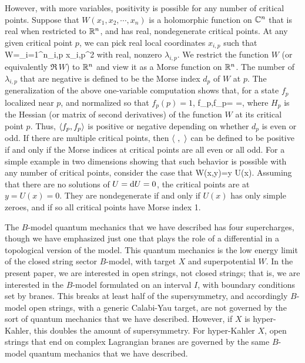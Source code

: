 \documentclass[11pt,a4paper]{article}
\begin{document}
However, with more variables, positivity is possible for any number of critical points.   Suppose that $W(x_1,x_2,\cdots, x_n)$ is a holomorphic function
on ${\mathbb C}^n$ that is real when restricted to ${\mathbb{R}}^n$, and has real, nondegenerate critical points.   At any given critical point $p$, we can pick real 
local coordinates $x_{i,p}$ such
that
\be\label{morse} W=\sum_{i=1}^n\lambda_{i,p} x_{i,p}^2 \ee
with real, nonzero $\lambda_{i,p}$.   
We restrict the function $W$ (or equivalently $\Re\,W$) to ${\mathbb{R}}^n$ and view it as a Morse function on ${\mathbb{R}}^n$.
The number of $\lambda_{i,p}$ that are negative is defined to be the Morse index $d_p$ of $W$ at $p$.  The generalization
of the above one-variable computation shows that, for a state $f_p$ localized near $p$, and normalized so that $f_p(p)=1$, 
\be\label{hessdet} \la f_p,f_p\ra= =, \ee
where $H_p$ is the Hessian (or matrix of second derivatives) of the function $W$ at its critical point $p$.
Thus, $\langle f_p,f_p\rangle$ is positive or negative depending on whether $d_p$ is even or odd.  If there are multiple critical points, then $\langle~,~\rangle$ can be defined to be
positive if and only if the Morse indices at critical points are all even or all odd.  For a simple example in two dimensions showing that such behavior is
possible with any number of critical points, consider the case that
\be\label{nvu} W(x,y)=y U(x). \ee
Assuming that there are no solutions of $U=\mathrm d U=0$, the critical points are at $y=U(x)=0$.  They are nondegenerate if and only if $U(x)$ has only simple zeroes, and if so all critical points have Morse index 1.


The $B$-model quantum mechanics that we have described has four supercharges, though we have emphasized just one that plays the role
of a differential in  a topological version of the model.   This quantum mechanics is the low energy limit of the closed string sector $B$-model, with target $X$ and
superpotential $W$.   In the present paper, we are interested in open strings, not closed strings; that is, we are interested in the $B$-model formulated
on an interval $I$, with boundary conditions set by branes.   This breaks at least half of the supersymmetry, and accordingly $B$-model open strings,
with a generic Calabi-Yau target, are not governed by the sort of quantum mechanics that we have described.   However, if $X$ is hyper-Kahler,
this doubles the amount of supersymmetry.   For hyper-Kahler $X$, open strings that end on complex Lagrangian branes are governed by
the same $B$-model quantum mechanics that we have described.
\end{document}
